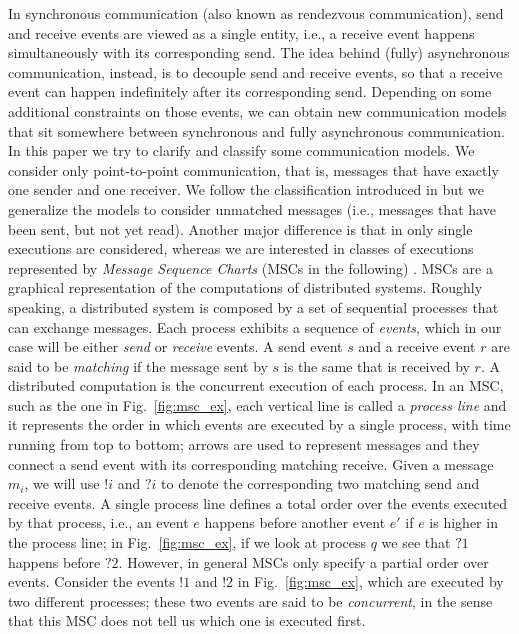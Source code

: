 


In synchronous communication (also known as rendezvous communication), send and receive events are  viewed as a single entity, i.e., a receive event  happens simultaneously with its corresponding send. The  idea behind (fully) asynchronous communication, instead, is to decouple send and receive events, so that a receive event can happen indefinitely after its corresponding send. Depending on some additional constraints on those events, we can obtain new communication models that sit somewhere between synchronous and fully asynchronous communication.
In this paper we try to clarify and classify some communication models.  We consider only point-to-point communication, that is, messages that have exactly one sender and one receiver.  We follow the classification introduced in \cite{DBLP:journals/fac/ChevrouHQ16} but we generalize the models to  consider unmatched messages (i.e., messages that have been sent, but not yet read). Another major difference is that in \cite{DBLP:journals/fac/ChevrouHQ16} only single executions are considered, whereas we are interested in classes of executions represented by \emph{Message Sequence Charts} (MSCs in the following) \cite{messagesequencecharts}.
MSCs are a graphical representation of the  computations of distributed systems.  Roughly speaking, a distributed system is composed by a set of sequential processes that can exchange messages. Each process exhibits a sequence of \emph{events}, which in our case will be either \emph{send} or \emph{receive} events. A send event $s$ and a receive event $r$ are said to be \emph{matching} if the message sent by $s$ is the same  that is received by $r$. A distributed computation is the concurrent execution of each process. In an MSC, such as the one in Fig.~\ref{fig:msc_ex}, each vertical line is called a \emph{process line} and it represents the order in which events are executed by a single process, with time running from top to bottom; arrows are used to represent messages and they connect a send event with its corresponding matching receive. 
Given a message $m_i$, we will use $!i$ and $?i$ to denote the corresponding two matching send and receive events. A single process line defines a total order over the events executed by that process, i.e., an event $e$ happens before another event $e'$ if $e$ is higher in the process line; in Fig.~\ref{fig:msc_ex}, if we look at process $q$ we see that $?1$ happens before $?2$. However, in general MSCs only specify a partial order over events. Consider the events $!1$ and $!2$ in Fig.~\ref{fig:msc_ex}, which are executed by two different processes; these two events are said to be \emph{concurrent}, in the sense that this MSC does not tell us which one is executed first. 
